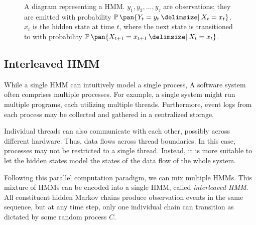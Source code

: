 \begin{figure}
    \caption{A diagram representing a HMM. \(y_1, y_2, ..., y_\tau\) are observations; they are emitted with probability \(\prob\pan{Y_t = y_t \giv X_t = x_t}\). \(x_t\) is the hidden state at time \(t\), where the next state is transitioned to with probability \(\prob\pan{X_{t + 1} = x_{t+1} \giv X_t = x_t}\).}
    \label{fig:hmm}
    \vspace{2ex}
\end{figure}

\subsection{Interleaved HMM}\label{sec:interleaved_hmm}

While a single HMM can intuitively model a single process, A software system often comprises multiple processes. For example, a single system might run multiple programs, each utilizing multiple threads. Furthermore, event logs from each process may be collected and gathered in a centralized storage. 

Individual threads can also communicate with each other, possibly across different hardware. Thus, data flows across thread boundaries. In this case, processes may not be restricted to a single thread. Instead, it is more suitable to let the hidden states model the states of the data flow of the whole system.

Following this parallel computation paradigm, we can mix multiple HMMs. This mixture of HMMs can be encoded into a single HMM, called \emph{interleaved HMM}\cite{Minot2014-gn}. All constituent hidden Markov chains produce observation events in the same sequence, but at any time step, only one individual chain can transition as dictated by some random process \(C\).

